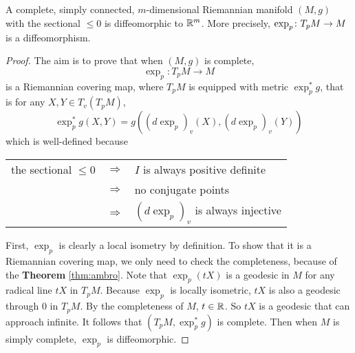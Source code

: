 \begin{enumerate}[label=\arabic{*}.]
	\begin{thm}
		A complete, simply connected, $m$-dimensional Riemannian manifold $(M,g)$ with the sectional $\leq 0$ is diffeomorphic to $\mathbb{R}^m$. More precisely, $\exp_p \colon T_pM \rightarrow M$ is a diffeomorphism.
	\end{thm}
	\begin{proof}
		The aim is to prove that when $(M,g)$ is complete,
		\begin{equation*}
			\exp_p \colon T_pM \longrightarrow M
		\end{equation*}
		is a Riemannian covering map, where $T_pM$ is equipped with metric $\exp_p^*g$, that is for any $X,Y \in T_v(T_pM)$,
		\begin{equation*}
			\exp_p^*g(X,Y) = g((d\exp_p)_v(X),(d\exp_p)_v(Y))
		\end{equation*}
		which is well-defined because
		\begin{center}
			\begin{tabular}{rcl}
				the sectional $\leq 0$ &$\Rightarrow$& $I$ is always positive definite \\
				&$\Rightarrow$& no conjugate points \\
				&$\Rightarrow$& $(d\exp_p)_v$ is always injective
			\end{tabular}
		\end{center}
		First, $\exp_p$ is clearly a local isometry by definition. To show that it is a Riemannian covering map, we only need to check the completeness, because of the \textbf{Theorem} \ref{thm:ambro}. Note that $\exp_p(tX)$ is a geodesic in $M$ for any radical line $tX$ in $T_pM$. Because $\exp_p$ is locally isometric, $tX$ is also a geodesic through $0$ in $T_pM$. By the completeness of $M$, $t \in \mathbb{R}$. So $tX$ is a geodesic that can approach infinite. It follows that $(T_pM,\exp_p^*g)$ is complete. Then when $M$ is simply complete, $\exp_p$ is diffeomorphic.
	\end{proof}


\end{enumerate}
